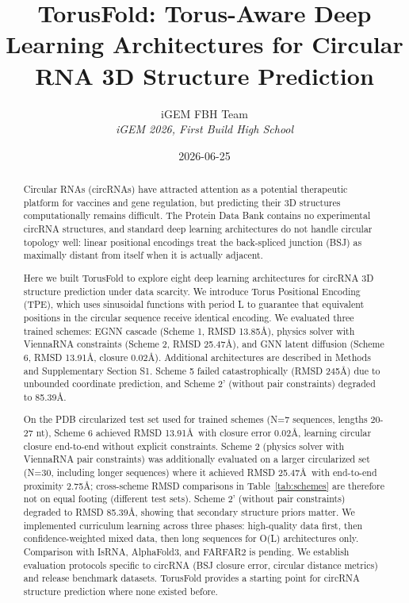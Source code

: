 \documentclass[12pt]{article}
\title{TorusFold: Torus-Aware Deep Learning Architectures for Circular RNA 3D Structure Prediction}
\author{
iGEM FBH Team\\
\textit{iGEM 2026, First Build High School}
}
\date{2026-06-25}
\begin{document}
\maketitle

\begin{abstract}
Circular RNAs (circRNAs) have attracted attention as a potential therapeutic platform for vaccines and gene regulation, but predicting their 3D structures computationally remains difficult. The Protein Data Bank contains no experimental circRNA structures, and standard deep learning architectures do not handle circular topology well: linear positional encodings treat the back-spliced junction (BSJ) as maximally distant from itself when it is actually adjacent.

Here we built TorusFold to explore eight deep learning architectures for circRNA 3D structure prediction under data scarcity. We introduce Torus Positional Encoding (TPE), which uses sinusoidal functions with period L to guarantee that equivalent positions in the circular sequence receive identical encoding. We evaluated three trained schemes: EGNN cascade (Scheme 1, RMSD 13.85\AA), physics solver with ViennaRNA constraints (Scheme 2, RMSD 25.47\AA), and GNN latent diffusion (Scheme 6, RMSD 13.91\AA, closure 0.02\AA). Additional architectures are described in Methods and Supplementary Section S1. Scheme 5 failed catastrophically (RMSD 245\AA) due to unbounded coordinate prediction, and Scheme 2' (without pair constraints) degraded to 85.39\AA.

On the PDB circularized test set used for trained schemes (N=7 sequences, lengths 20-27 nt), Scheme 6 achieved RMSD 13.91\AA\ with closure error 0.02\AA, learning circular closure end-to-end without explicit constraints. Scheme 2 (physics solver with ViennaRNA pair constraints) was additionally evaluated on a larger circularized set (N=30, including longer sequences) where it achieved RMSD 25.47\AA\ with end-to-end proximity 2.75\AA; cross-scheme RMSD comparisons in Table~\ref{tab:schemes} are therefore not on equal footing (different test sets). Scheme 2' (without pair constraints) degraded to RMSD 85.39\AA, showing that secondary structure priors matter. We implemented curriculum learning across three phases: high-quality data first, then confidence-weighted mixed data, then long sequences for O(L) architectures only. Comparison with IsRNA, AlphaFold3, and FARFAR2 is pending. We establish evaluation protocols specific to circRNA (BSJ closure error, circular distance metrics) and release benchmark datasets. TorusFold provides a starting point for circRNA structure prediction where none existed before.
\end{abstract}
\end{document}
